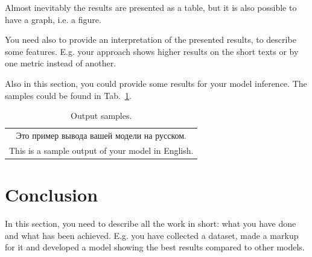 \documentclass[a4paper,12pt]{article}
\begin{document}
Almost inevitably the results are presented as a table, but it is also possible to have a graph, i.e. a figure.

You need also to provide an interpretation of the presented results, to describe some features. E.g. your approach shows higher results on the short texts or by one metric instead of another.

Also in this section, you could provide some results for your model inference. The samples could be found in Tab.~\ref{tab:output}.

\begin{table}[!tbh]
    \centering
    \begin{tabular}{|c|}
\hline
Это пример вывода вашей модели на русском.\\
This is a sample output of your model in English.
\\
\hline
    \end{tabular}
    \caption{Output samples.}
    \label{tab:output}
\end{table}

\section{Conclusion}
In this section, you need to describe all the work in short: what you have done and what has been achieved. E.g. you have collected a dataset, made a markup for it and developed a model showing the best results compared to other models. 


\begin{otherlanguage}{english}
\printbibliography[
    heading=bibintoc
]
\end{otherlanguage}
\end{document}

